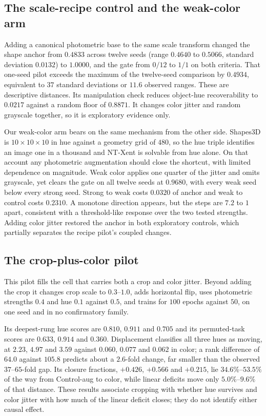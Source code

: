 \documentclass[10pt]{article}
\begin{document}
\subsection*{The scale-recipe control and the weak-color arm}
Adding a canonical
photometric base to the same scale transform changed the shape anchor from $0.4833$ across twelve
seeds
(range $0.4640$ to $0.5066$, standard deviation $0.0132$) to $1.0000$, and the gate from $0/12$ to
$1/1$ on both criteria. That one-seed pilot exceeds the maximum of the twelve-seed comparison by
$0.4934$, equivalent to $37$ standard deviations or $11.6$ observed ranges. These are descriptive
distances. Its manipulation check reduces object-hue recoverability to $0.0217$ against a random
floor of $0.8871$. It changes color jitter and random grayscale together, so it is
exploratory evidence only.

Our weak-color arm bears on the same mechanism from the other side. Shapes3D is
$10\times10\times10$ in hue against a geometry grid of $480$, so the hue triple identifies an image
one in a thousand and NT-Xent is solvable from hue alone. On that account any photometric
augmentation should close the shortcut, with limited dependence on magnitude. Weak color applies one
quarter of the jitter and omits grayscale, yet clears the gate on all twelve seeds at
$0.9680$, with every weak seed below every strong seed. Strong to weak costs $0.0320$ of anchor and
weak to control costs $0.2310$. A monotone direction appears, but the steps are $7.2$ to $1$ apart,
consistent with a threshold-like response over the two tested strengths. Adding color jitter
restored the anchor in both exploratory controls, which partially separates the recipe pilot's
coupled changes.

\subsection*{The crop-plus-color pilot}
This pilot fills the cell that carries both a crop and color jitter. Beyond adding the crop it
changes crop scale to $0.3$--$1.0$, adds horizontal flip, uses photometric strengths $0.4$ and hue
$0.1$ against $0.5$, and trains for $100$ epochs against $50$, on one seed and in no
confirmatory family.

Its deepest-rung hue scores are $0.810$, $0.911$ and $0.705$ and its permuted-task scores
are $0.633$, $0.914$ and $0.360$. Displacement classifies all three hues as moving, at
$2.23$, $4.97$ and $3.59$ against $0.060$, $0.077$ and $0.062$ in color; a rank difference of $64.0$
against $105.8$ predicts about a $2.6$-fold change, far smaller than the observed
$37$--$65$-fold gap. Its closure fractions, $+0.426$, $+0.566$ and $+0.215$, lie $34.6\%$--$53.5\%$
of the way from Control-aug to color, while linear deficits move only $5.0\%$--$9.6\%$ of that
distance. These results associate cropping with whether hue survives and color jitter with
how much of the linear deficit closes; they do not identify either causal effect.
\end{document}
